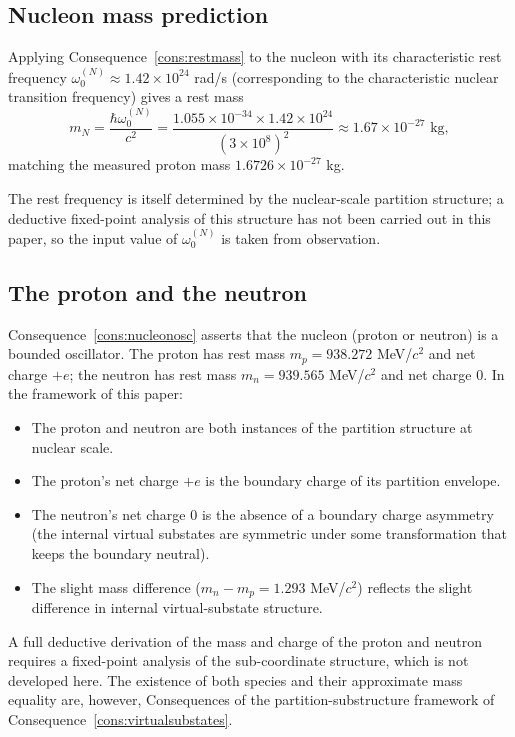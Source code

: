 \documentclass[11pt,twocolumn,a4paper]{article}
\theoremstyle{axiomstyle}
\theoremstyle{conseqstyle}
\theoremstyle{definition}
\theoremstyle{remark}
\begin{document}
\subsection{Nucleon mass prediction}

Applying Consequence~\ref{cons:restmass} to the nucleon with its characteristic rest frequency $\omega_{0}^{(N)}\approx 1.42\times 10^{24}$ rad/s (corresponding to the characteristic nuclear transition frequency) gives a rest mass
\begin{equation*}
m_{N}=\frac{\hbar\omega_{0}^{(N)}}{c^{2}}=\frac{1.055\times 10^{-34}\times 1.42\times 10^{24}}{(3\times 10^{8})^{2}}\approx 1.67\times 10^{-27}\text{ kg},
\end{equation*}
matching the measured proton mass $1.6726\times 10^{-27}$ kg.

The rest frequency is itself determined by the nuclear-scale partition structure; a deductive fixed-point analysis of this structure has not been carried out in this paper, so the input value of $\omega_{0}^{(N)}$ is taken from observation.

\subsection{The proton and the neutron}

Consequence~\ref{cons:nucleonosc} asserts that the nucleon (proton or neutron) is a bounded oscillator. The proton has rest mass $m_{p}=938.272$ MeV/$c^{2}$ and net charge $+e$; the neutron has rest mass $m_{n}=939.565$ MeV/$c^{2}$ and net charge $0$. In the framework of this paper:
\begin{itemize}
\item The proton and neutron are both instances of the partition structure at nuclear scale.
\item The proton's net charge $+e$ is the boundary charge of its partition envelope.
\item The neutron's net charge $0$ is the absence of a boundary charge asymmetry (the internal virtual substates are symmetric under some transformation that keeps the boundary neutral).
\item The slight mass difference ($m_{n}-m_{p}=1.293$ MeV/$c^{2}$) reflects the slight difference in internal virtual-substate structure.
\end{itemize}

A full deductive derivation of the mass and charge of the proton and neutron requires a fixed-point analysis of the sub-coordinate structure, which is not developed here. The existence of both species and their approximate mass equality are, however, Consequences of the partition-substructure framework of Consequence~\ref{cons:virtualsubstates}.
\end{document}
